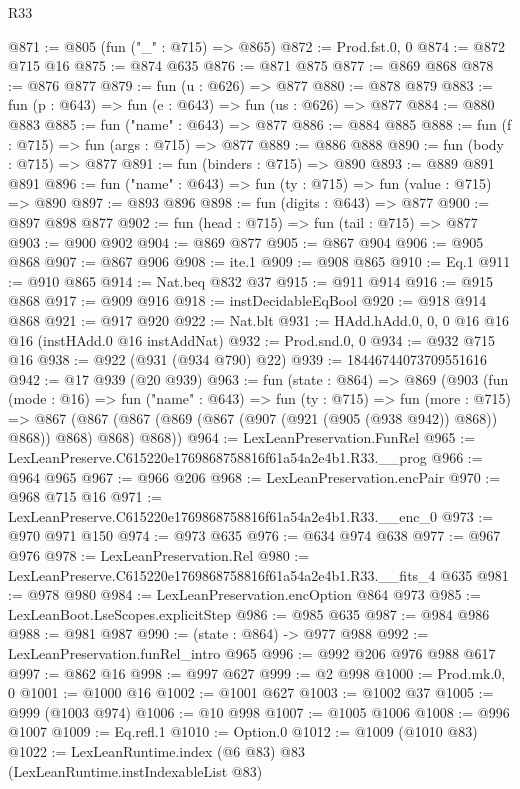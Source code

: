 \begin{lexlean}{R33}
\begin{coremodule}
@871 := @805 (fun ("_" : @715) => @865)
@872 := Prod.fst.{0, 0}
@874 := @872 @715 @16
@875 := @874 @635
@876 := @871 @875
@877 := @869 @868
@878 := @876 @877
@879 := fun (u : @626) => @877
@880 := @878 @879
@883 := fun (p : @643) => fun (e : @643) => fun (us : @626) => @877
@884 := @880 @883
@885 := fun ("name" : @643) => @877
@886 := @884 @885
@888 := fun (f : @715) => fun (args : @715) => @877
@889 := @886 @888
@890 := fun (body : @715) => @877
@891 := fun (binders : @715) => @890
@893 := @889 @891 @891
@896 := fun ("name" : @643) => fun (ty : @715) => fun (value : @715) => @890
@897 := @893 @896
@898 := fun (digits : @643) => @877
@900 := @897 @898 @877
@902 := fun (head : @715) => fun (tail : @715) => @877
@903 := @900 @902
@904 := @869 @877
@905 := @867 @904
@906 := @905 @868
@907 := @867 @906
@908 := ite.{1}
@909 := @908 @865
@910 := Eq.{1}
@911 := @910 @865
@914 := Nat.beq @832 @37
@915 := @911 @914
@916 := @915 @868
@917 := @909 @916
@918 := instDecidableEqBool
@920 := @918 @914 @868
@921 := @917 @920
@922 := Nat.blt
@931 := HAdd.hAdd.{0, 0, 0} @16 @16 @16 (instHAdd.{0} @16 instAddNat)
@932 := Prod.snd.{0, 0}
@934 := @932 @715 @16
@938 := @922 (@931 (@934 @790) @22)
@939 := 18446744073709551616
@942 := @17 @939 (@20 @939)
@963 := fun (state : @864) =>
  @869
    (@903
      (fun (mode : @16) =>
      fun ("name" : @643) =>
      fun (ty : @715) =>
      fun (more : @715) =>
      @867 (@867 (@867 (@869 (@867 (@907 (@921 (@905 (@938 @942)) @868)) @868)) @868) @868) @868))
@964 := LexLeanPreservation.FunRel
@965 := LexLeanPreserve.C615220e1769868758816f61a54a2e4b1.R33.__prog
@966 := @964 @965
@967 := @966 @206
@968 := LexLeanPreservation.encPair
@970 := @968 @715 @16
@971 := LexLeanPreserve.C615220e1769868758816f61a54a2e4b1.R33.__enc_0
@973 := @970 @971 @150
@974 := @973 @635
@976 := @634 @974 @638
@977 := @967 @976
@978 := LexLeanPreservation.Rel
@980 := LexLeanPreserve.C615220e1769868758816f61a54a2e4b1.R33.__fits_4 @635
@981 := @978 @980
@984 := LexLeanPreservation.encOption @864 @973
@985 := LexLeanBoot.LseScopes.explicitStep
@986 := @985 @635
@987 := @984 @986
@988 := @981 @987
@990 := (state : @864) -> @977 @988
@992 := LexLeanPreservation.funRel_intro @965
@996 := @992 @206 @976 @988 @617
@997 := @862 @16
@998 := @997 @627
@999 := @2 @998
@1000 := Prod.mk.{0, 0}
@1001 := @1000 @16
@1002 := @1001 @627
@1003 := @1002 @37
@1005 := @999 (@1003 @974)
@1006 := @10 @998
@1007 := @1005 @1006
@1008 := @996 @1007
@1009 := Eq.refl.{1}
@1010 := Option.{0}
@1012 := @1009 (@1010 @83)
@1022 := LexLeanRuntime.index
    (@6 @83)
    @83
    (LexLeanRuntime.instIndexableList @83)

\end{coremodule}
\end{lexlean}
